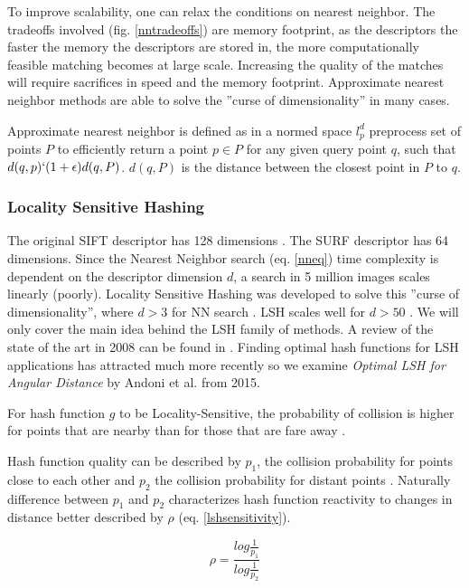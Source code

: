 \documentclass[english,12pt,a4paper,pdftex,elec,utf8]{aaltothesis}
\begin{document}
To improve scalability, one can relax the conditions on nearest neighbor. The tradeoffs involved (fig. \ref{nntradeoffs}) are memory footprint, as the descriptors the faster the memory the descriptors are stored in, the more computationally feasible matching becomes at large scale. Increasing the quality of the matches will require sacrifices in speed and the memory footprint. Approximate nearest neighbor methods are able to solve the ''curse of dimensionality'' in many cases.

Approximate nearest neighbor is defined as in a normed space $l_p^d$ preprocess set of points $P$ to efficiently return a point $p\in P$ for any given query point $q$, such that $d(q,p) \lq (1 + \epsilon)d(q,P)$. $d(q, P)$ is the distance between the closest point in $P$ to $q$. \cite{Gionis1999}

\subsubsection{Locality Sensitive Hashing}
The original SIFT descriptor has 128 dimensions \cite{Lowe1999}.  The SURF descriptor has 64 dimensions. Since the Nearest Neighbor search (eq. \ref{nneq}) time complexity is dependent on the descriptor dimension $d$, a search in 5 million images scales linearly (poorly). Locality Sensitive Hashing was developed to solve this ''curse of dimensionality'', where $d > 3$ for NN search \cite{Gionis1999}. LSH scales well for $d > 50$ \cite{Gionis1999}. We will only cover the main idea behind the LSH family of methods. A review of the state of the art in 2008 can be found in \cite{Andoni2008}. Finding optimal hash functions for LSH applications has attracted much more recently so we examine \emph{Optimal LSH for Angular Distance} \cite{Andoni2015} by Andoni et al. from 2015.

For hash function $g$ to be Locality-Sensitive, the probability of collision is higher for points that are nearby than for those that are fare away \cite{Andoni2015}.

Hash function quality can be described by $p_1$, the collision probability for points close to each other and $p_2$ the collision probability for distant points \cite{Andoni2015}. Naturally difference between $p_1$ and $p_2$ characterizes hash function reactivity to changes in distance better described by $\rho$ (eq. \ref{lshsensitivity}).

\begin{equation}
  \label{lshsensitivity}
  \rho = \frac{log\frac{1}{p_1}}{log\frac{1}{p_2}}
  \end{equation}
\end{document}
